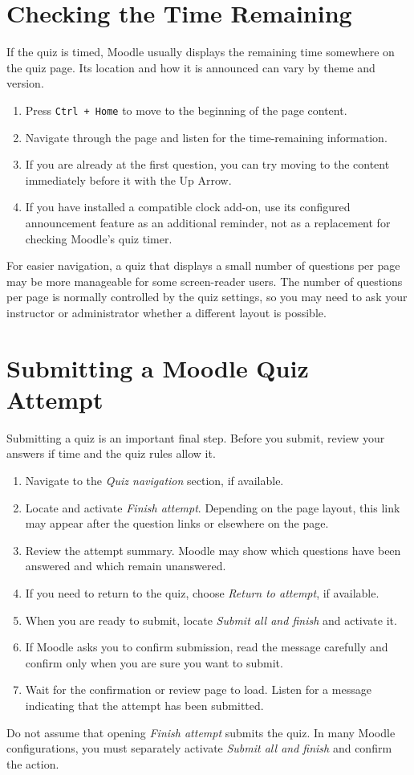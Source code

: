 \documentclass[11pt,oneside]{book}
\begin{document}
\chapter{Checking the Time Remaining}
If the quiz is timed, Moodle usually displays the remaining time somewhere on the quiz page. Its location and how it is announced can vary by theme and version.
\begin{enumerate}
	\item Press \texttt{Ctrl + Home} to move to the beginning of the page content.
	\item Navigate through the page and listen for the time-remaining information.
	\item If you are already at the first question, you can try moving to the content immediately before it with the Up Arrow.
	\item If you have installed a compatible clock add-on, use its configured announcement feature as an additional reminder, not as a replacement for checking Moodle's quiz timer.
\end{enumerate}
For easier navigation, a quiz that displays a small number of questions per page may be more manageable for some screen-reader users. The number of questions per page is normally controlled by the quiz settings, so you may need to ask your instructor or administrator whether a different layout is possible.

\chapter{Submitting a Moodle Quiz Attempt}
Submitting a quiz is an important final step. Before you submit, review your answers if time and the quiz rules allow it.

\begin{enumerate}
	\item Navigate to the \textit{Quiz navigation} section, if available.
	\item Locate and activate \textit{Finish attempt}. Depending on the page layout, this link may appear after the question links or elsewhere on the page.
	\item Review the attempt summary. Moodle may show which questions have been answered and which remain unanswered.
	\item If you need to return to the quiz, choose \textit{Return to attempt}, if available.
	\item When you are ready to submit, locate \textit{Submit all and finish} and activate it.
	\item If Moodle asks you to confirm submission, read the message carefully and confirm only when you are sure you want to submit.
	\item Wait for the confirmation or review page to load. Listen for a message indicating that the attempt has been submitted.
\end{enumerate}
Do not assume that opening \textit{Finish attempt} submits the quiz. In many Moodle configurations, you must separately activate \textit{Submit all and finish} and confirm the action.
\end{document}
